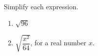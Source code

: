 Simplify each expression.
\begin{enumerate}
\item[(a)] $\sqrt{96}$
\item[(b)] $\sqrt{\dfrac{x^2}{64}}$, for a real number $x$.
\end{enumerate}
